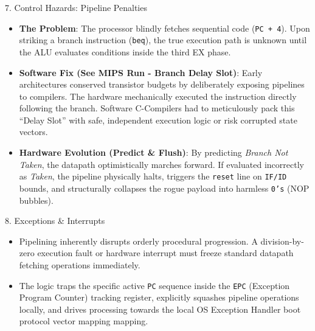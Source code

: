 \documentclass[aspectratio=169]{beamer}
\begin{document}
\begin{frame}{7. Control Hazards: Pipeline Penalties}
\begin{itemize}
    \item \textbf{The Problem}: The processor blindly fetches sequential code (\texttt{PC + 4}). Upon striking a branch instruction (\texttt{beq}), the true execution path is unknown until the ALU evaluates conditions inside the third EX phase.
    \item \textbf{Software Fix (See MIPS Run - Branch Delay Slot)}: Early architectures conserved transistor budgets by deliberately exposing pipelines to compilers. The hardware mechanically executed the instruction directly following the branch. Software C-Compilers had to meticulously pack this ``Delay Slot'' with safe, independent execution logic or risk corrupted state vectors.
    \item \textbf{Hardware Evolution (Predict \& Flush)}: By predicting \textit{Branch Not Taken}, the datapath optimistically marches forward. If evaluated incorrectly as \textit{Taken}, the pipeline physically halts, triggers the \texttt{reset} line on \texttt{IF/ID} bounds, and structurally collapses the rogue payload into harmless \texttt{0's} (NOP bubbles).
\end{itemize}
\end{frame}

\begin{frame}{8. Exceptions \& Interrupts}
\begin{itemize}
    \item Pipelining inherently disrupts orderly procedural progression. A division-by-zero execution fault or hardware interrupt must freeze standard datapath fetching operations immediately.
    \item The logic traps the specific active \texttt{PC} sequence inside the \texttt{EPC} (Exception Program Counter) tracking register, explicitly squashes pipeline operations locally, and drives processing towards the local OS Exception Handler boot protocol vector mapping mapping.
\end{itemize}
\end{frame}
\end{document}

